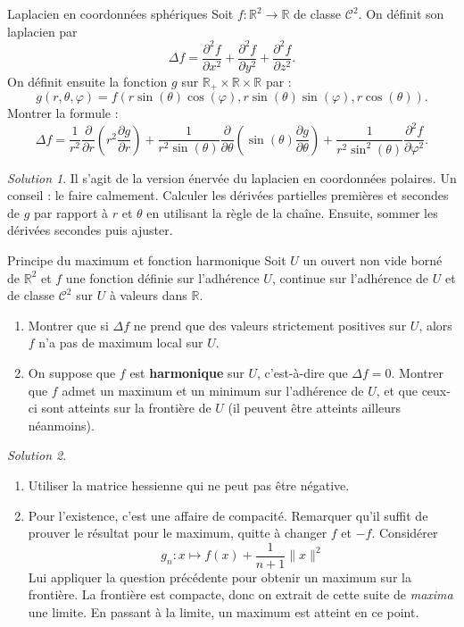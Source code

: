 \documentclass[french]{book}
\newcommand{\R}{\mathbb{R}}
\theoremstyle{definition}
\theoremstyle{remark}
\newtheorem*{sol}{Solution}
\begin{document}
\begin{exo}[1]{Laplacien en coordonnées sphériques}
	Soit $f:\R^2\to\R$ de classe $\mathcal{C}^2$. On définit son laplacien par $$\Delta f=\frac{\partial^2 f}{\partial x^2}+\frac{\partial^2 f}{\partial y^2}+\frac{\partial^2 f}{\partial z^2}.$$ On définit ensuite la fonction $g$ sur $\R_+\times\R\times\R$ par : $$g(r,\theta,\varphi)=f(r\sin(\theta)\cos(\varphi),r\sin(\theta)\sin(\varphi),r\cos(\theta)).$$ Montrer la formule : $$\Delta f=\frac{1}{r^2}\frac{\partial}{\partial r}\left(r^2\frac{\partial g}{\partial r}\right)+\frac{1}{r^2\sin(\theta)}\frac{\partial}{\partial\theta}\left(\sin(\theta)\frac{\partial g}{\partial\theta}\right)+\frac{1}{r^2\sin^2(\theta)}\frac{\partial^2 f}{\partial\varphi^2}.$$
\end{exo}
\begin{sol}
	Il s'agit de la version énervée du laplacien en coordonnées polaires. Un conseil : le faire calmement. Calculer les dérivées partielles premières et secondes de $g$ par rapport à $r$ et $\theta$ en utilisant la règle de la chaîne. Ensuite, sommer les dérivées secondes puis ajuster.
\end{sol}

\begin{exo}[1]{Principe du maximum et fonction harmonique}
	Soit $U$ un ouvert non vide borné de $\R^2$ et $f$ une fonction définie sur l'adhérence $U$, continue sur l'adhérence de $U$ et de classe $\mathcal{C}^2$ sur $U$ à valeurs dans $\R$.
	\begin{enumerate}
		\item Montrer que si $\Delta f$ ne prend que des valeurs strictement positives sur $U$, alors $f$ n'a pas de maximum local sur $U$.
		\item On suppose que $f$ est \textbf{harmonique} sur $U$, c'est-à-dire que $\Delta f=0$. Montrer que $f$ admet un maximum et un minimum sur l'adhérence de $U$, et que ceux-ci sont atteints sur la frontière de $U$ (il peuvent être atteints ailleurs néanmoins).
	\end{enumerate}
\end{exo}
\begin{sol}
	\begin{enumerate}
		\item Utiliser la matrice hessienne qui ne peut pas être négative.
		\item Pour l'existence, c'est une affaire de compacité. Remarquer qu'il suffit de prouver le résultat pour le maximum, quitte à changer $f$ et $-f$. Considérer $$g_n:x\mapsto f(x)+\frac{1}{n+1}\lVert x\rVert^2$$ Lui appliquer la question précédente pour obtenir un maximum sur la frontière. La frontière est compacte, donc on extrait de cette suite de \textit{maxima} une limite. En passant à la limite, un maximum est atteint en ce point.
	\end{enumerate}
\end{sol}
\end{document}
